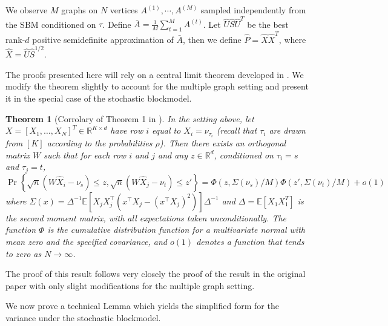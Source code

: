 \documentclass[10pt,letterpaper]{article}
\newtheorem{theorem}[fact]{Theorem}
\renewcommand{\Re}{\mathbb{R}}
\newcommand{\Ex}{\mathbb{E}}
\renewcommand{\hat}{\widehat}
\begin{document}
We observe $M$ graphs on $N$ vertices $A^{(1)}, \cdots, A^{(M)}$ sampled independently from the SBM conditioned on $\tau$.
Define $\bar{A} = \frac{1}{M} \sum_{t=1}^M A^{(t)}$. Let $\hat{U} \hat{S} \hat{U}^T$ be the best rank-$d$ positive semidefinite approximation of $\bar{A}$, then we define $\hat{P} = \hat{X} \hat{X}^T$, where $\hat{X} = \hat{U} \hat{S}^{1/2}$.




The proofs presented here will rely on a central limit theorem developed in \cite{athreya2013limit}. 
We modify the theorem slightly to account for the multiple graph setting and present it in the special case of the stochastic blockmodel.

\begin{theorem}[Corrolary of Theorem 1 in \cite{athreya2013limit}]\label{thm:clt_ext}
  In the setting above, let $X=[X_1,\dotsc,X_N]^T\in\Re^{K\times d}$ have row $i$ equal to $X_i=\nu_{\tau_i}$ (recall that $\tau_i$ are drawn from $[K]$ according to the probabilities $\rho$).
	Then there exists an orthogonal matrix $W$ such that for each row $i$ and $j$ and any $z \in \Re^{d}$, conditioned on $\tau_i=s$ and $\tau_j=t$,
  \begin{equation}
    \label{eq:4}
    \Pr\left\{\sqrt{n}( W \hat{X}_i - \nu_s ) \leq z, \sqrt{n}( W \hat{X}_j - \nu_t) \leq z'\right\}
=  \Phi(z, \Sigma(\nu_s)/M)  \Phi(z', \Sigma(\nu_t)/M) +o(1)
  \end{equation}
  where $\Sigma(x) =\Delta^{-1}\Ex[ X_j X_j^\top(x^\top X_j -(x^\top
  X_j)^2)]\Delta^{-1}$ and $\Delta=\Ex[ X_1 X_{1}^{T}]$ is the second
  moment matrix, with all expectations taken unconditionally.
  The function $\Phi$ is the cumulative distribution function for a multivariate normal with mean zero and the specified covariance, and $o(1)$ denotes a function that tends to zero as $N\to \infty$.
\end{theorem}
The proof of this result follows very closely the proof of the result in the original paper with only slight modifications for the multiple graph setting.

We now prove a technical Lemma which yields the simplified form for the variance under the stochastic blockmodel.
\end{document}
